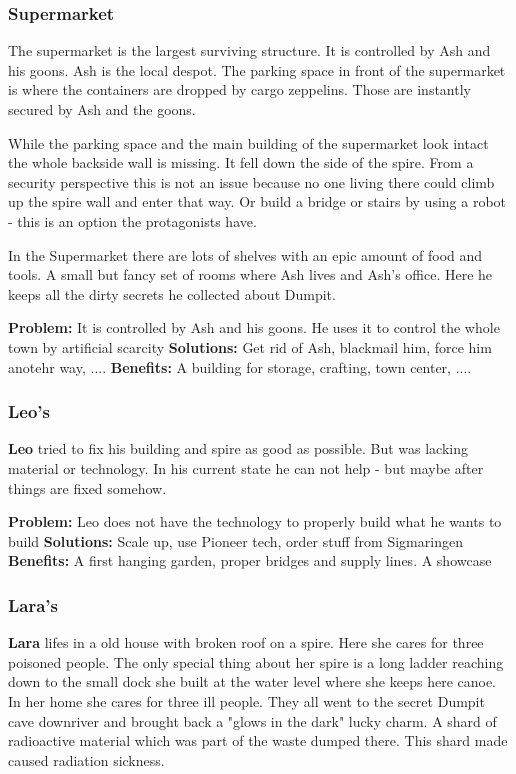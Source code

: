 \subsubsection{Supermarket}

The supermarket is the largest surviving structure. It is controlled by Ash and his goons. Ash is the local despot. The parking space in front of the supermarket is where the containers are dropped by cargo zeppelins. Those are instantly secured by Ash and the goons.

While the parking space and the main building of the supermarket look intact the whole backside wall is missing. It fell down the side of the spire. From a security perspective this is not an issue because no one living there could climb up the spire wall and enter that way. Or build a bridge or stairs by using a robot - this is an option the protagonists have.

In the Supermarket there are lots of shelves with an epic amount of food and tools. A small but fancy set of rooms where Ash lives and Ash's office. Here he keeps all the dirty secrets he collected about Dumpit.

\textbf{Problem:} It is controlled by Ash and his goons. He uses it to control the whole town by artificial scarcity
\textbf{Solutions:} Get rid of Ash, blackmail him, force him anotehr way, ....
\textbf{Benefits:} A building for storage, crafting, town center, ....

\subsubsection{Leo's}

\textbf{Leo} tried to fix his building and spire as good as possible. But was lacking material or technology. In his current state he can not help - but maybe after things are fixed somehow.

\textbf{Problem:} Leo does not have the technology to properly build what he wants to build
\textbf{Solutions:} Scale up, use Pioneer tech, order stuff from Sigmaringen
\textbf{Benefits:} A first hanging garden, proper bridges and supply lines. A showcase

\subsubsection{Lara's}

\textbf{Lara} lifes in a old house with broken roof on a spire. Here she cares for three poisoned people. The only special thing about her spire is a long ladder reaching down to the small dock she built at the water level where she keeps here canoe.
In her home she cares for three ill people. They all went to the secret Dumpit cave downriver and brought back a "glows in the dark" lucky charm. A shard of radioactive material which was part of the waste dumped there. This shard made caused radiation sickness.

